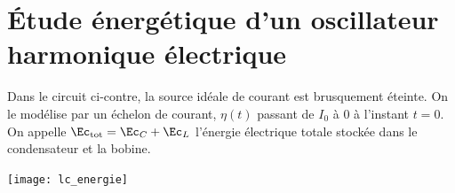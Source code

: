 \documentclass[a4paper, 12pt, final, garamond]{book}
\begin{document}

\resetQ
\section{Étude énergétique d'un oscillateur harmonique électrique}

\begin{minipage}{0.6\linewidth}

    Dans le circuit ci-contre, la source idéale de courant est brusquement
    éteinte. On le modélise par un échelon de courant, $\eta(t)$ passant de
    $I_0$ à 0 à l'instant $t = 0$. On appelle $\Ec_{\rm tot} = \Ec_C + \Ec_L$
    l'énergie électrique totale stockée dans le condensateur et la bobine.
\end{minipage}
\begin{minipage}{0.4\linewidth}
    \centering
    \texttt{[image: lc\_energie]}
\end{minipage}
\end{document}
